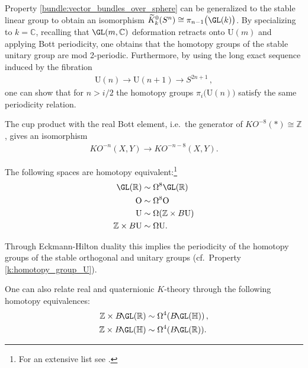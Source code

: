{    \begin{property}\label{k:homotopy_group_U}
        Property \ref{bundle:vector_bundles_over_sphere} can be generalized to the stable linear group to obtain an isomorphism $\widetilde{K}^0_k(S^n)\cong\pi_{n-1}\big(\GL(k)\big)$. By specializing to $k=\mathbb{C}$, recalling that $\GL(m,\mathbb{C})$ deformation retracts onto $\mathrm{U}(m)$ and applying Bott periodicity, one obtains that the homotopy groups of the stable unitary group are mod 2-periodic. Furthermore, by using the long exact sequence induced by the fibration
        \begin{gather}
            \mathrm{U}(n)\rightarrow\mathrm{U}(n+1)\rightarrow S^{2n+1}\,,
        \end{gather}
        one can show that for $n>i/2$ the homotopy groups $\pi_i\big(\mathrm{U}(n)\big)$ satisfy the same periodicity relation.
    \end{property}

    \begin{theorem}
        The cup product with the real Bott element, i.e.~the generator of $K\!O^{-8}(\ast)\cong\mathbb{Z}$, gives an isomorphism
        \begin{gather}
            K\!O^{-n}(X,Y)\rightarrow K\!O^{-n-8}(X,Y).
        \end{gather}
    \end{theorem}

    \begin{theorem}
        The following spaces are homotopy equivalent:\footnote{For an extensive list see \cite{karoubi}.}
        \begin{align}
            \GL(\mathbb{R})&\sim\Omega^8\GL(\mathbb{R})\\
            \mathrm{O}&\sim\Omega^8\mathrm{O}\\
            \mathrm{U}&\sim\Omega(\mathbb{Z}\times B\mathrm{U})\\
            \mathbb{Z}\times B\mathrm{U}&\sim\Omega\mathrm{U}.
        \end{align}
    \end{theorem}
    \begin{result}
        Through Eckmann-Hilton duality this implies the periodicity of the homotopy groups of the stable orthogonal and unitary groups (cf.~Property \ref{k:homotopy_group_U}).
    \end{result}
    \begin{property}
        One can also relate real and quaternionic $K$-theory through the following homotopy equivalences:
        \begin{align}
            \mathbb{Z}\times B\!\GL(\mathbb{R})&\sim\Omega^4(B\!\GL(\mathbb{H}))\,,\\
            \mathbb{Z}\times B\!\GL(\mathbb{H})&\sim\Omega^4(B\!\GL(\mathbb{R})).
        \end{align}
    \end{property}

}
